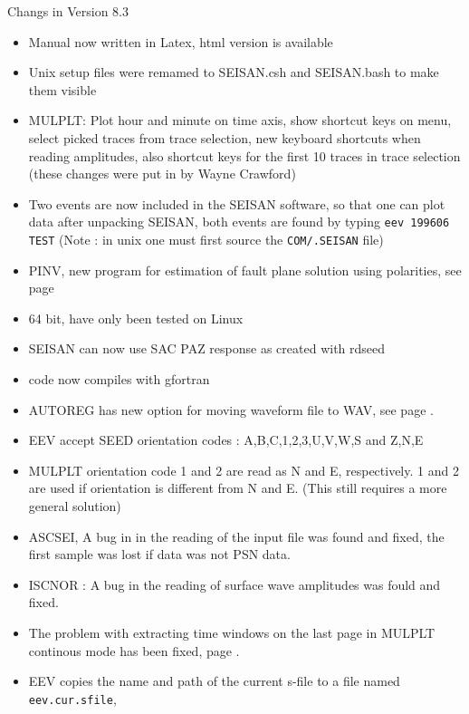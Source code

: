 Changs in Version 8.3 
\begin{itemize}
\item Manual now written in Latex, html version is available
\item Unix setup files were remamed to SEISAN.csh and SEISAN.bash to make them visible
\item MULPLT: Plot hour and minute on time axis, show shortcut keys on menu, select picked traces from trace selection, new keyboard shortcuts when reading amplitudes, also shortcut keys for the first 10 traces in trace selection (these changes were put in by Wayne Crawford)
\item Two events are now included in the SEISAN software, so that one can plot data after unpacking SEISAN, both events are found by typing \texttt{eev 199606 TEST} (Note : in unix one must first source the \texttt{COM/.SEISAN} file)
\item PINV, new program for estimation of fault plane solution using polarities, see page \pageref{page:pinv}
\item 64 bit, have only been tested on Linux
\item SEISAN can now use SAC PAZ response as created with rdseed
\item code now compiles with gfortran
\item AUTOREG has new option for moving waveform file to WAV, see page \pageref{page:autoreg}.
\item EEV accept SEED orientation codes : A,B,C,1,2,3,U,V,W,S and Z,N,E
\item MULPLT orientation code 1 and 2 are read as N and E, respectively. 1 and 2 are used if orientation is different from N and E. (This still requires a more general solution)
\item ASCSEI, A bug in in the reading of the input file was found and fixed, the first sample was lost if data was not PSN data.
\item ISCNOR : A bug in the reading of surface wave amplitudes was fould and fixed.
\item The problem with extracting time windows on the last page in MULPLT 
continous mode has been fixed, page \pageref{page:mulplt.ext}.
\item EEV copies the name and path of the 
current s-file to a file named \texttt{eev.cur.sfile},

\end{itemize}
